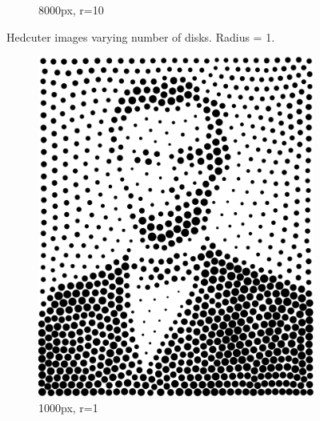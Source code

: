 \documentclass[11pt]{article}
\begin{document}
\begin{figure}[H]
\begin{subfigure}[b]{0.2\linewidth}
		\caption{8000px, r=10}
	\end{subfigure}
	\caption{Hedcuter images varying number of disks. Radius = 1.}
	\label{fig:hc_points1}
\end{figure}

\begin{figure}[H]
	\centering
	\begin{subfigure}[b]{0.2\linewidth}
		\includegraphics[width=\linewidth]{pix/vr_AL_1000_r1.png}
		\caption{1000px, r=1}
	\end{subfigure}
	\begin{subfigure}[b]{0.2\linewidth}

\end{subfigure}
\end{figure}
\end{document}
